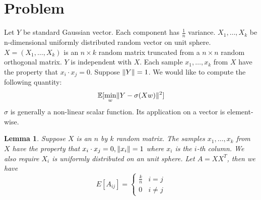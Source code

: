 \documentclass{article}
\DeclarePairedDelimiter\norm{\lVert}{\rVert}
\def\E{\mathbb{E}}
\newtheorem{lemma}{Lemma}
\begin{document}
\section{Problem}
Let $Y$ be standard Gaussian vector.
Each component has $ \frac{1}{n}$ variance.
$X_1, \dots, X_k$ be
n-dimensional uniformly distributed random vector on unit sphere.
$X=(X_1, \dots, X_k)$ is an $n\times k$ random matrix
truncated from a $n\times n$ random orthogonal matrix.
$Y$ is independent with $X$.
Each sample $x_1, \dots, x_k$ from $X$ have the property that
$x_i \cdot x_j = 0$. Suppose $\norm{Y}=1$.
We would like to compute the following quantity:
\begin{equation}\label{eq:Eminw}
\E[\min_w \norm{Y - \sigma (X w ) }^2]
\end{equation}
$\sigma$ is generally a non-linear scalar function.
Its application on a vector is element-wise.
\begin{lemma}\label{lem:uniform}
Suppose $X$ is an $n$ by $k$ random matrix.
The samples $x_1, \dots, x_k$ from $X$ have the property that
$x_i \cdot x_j = 0, \norm{x_i}=1$ where $x_i$ is the $i$-th column.
We also require $X_i$ is uniformly distributed on an unit sphere.
Let $A=X X^T$, then we have
\begin{equation}
E[A_{ij}]= \begin{cases}
\frac{k}{n} & i = j\\
0 & i\neq j
\end{cases}
\end{equation}
\end{lemma}
\end{document}
